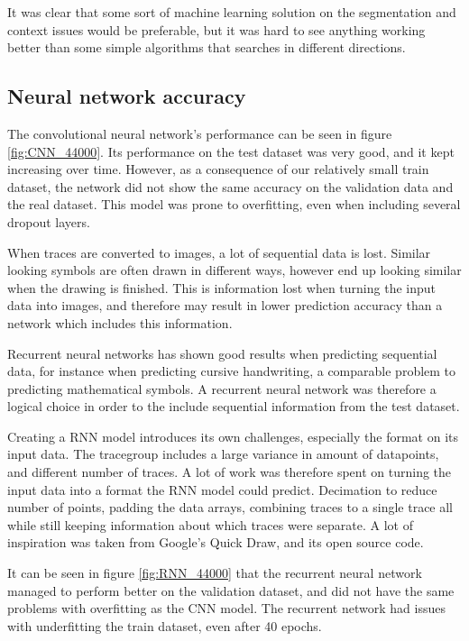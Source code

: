 It was clear that some sort of machine learning solution on the segmentation and context issues would be preferable, but it was hard to see anything working better than some simple algorithms that searches in different directions.

\subsection{Neural network accuracy}
The convolutional neural network's performance can be seen in figure \ref{fig:CNN_44000}. Its performance on the test dataset was very good, and it kept increasing over time. However, as a consequence of our relatively small train dataset, the network did not show the same accuracy on the validation data and the real dataset. This model was prone to overfitting, even when including several dropout layers. 

When traces are converted to images, a lot of sequential data is lost. Similar looking symbols are often drawn in different ways, however end up looking similar when the drawing is finished. This is information lost when turning the input data into images, and therefore may result in lower prediction accuracy than a network which includes this information.

Recurrent neural networks has shown good results when predicting sequential data, for instance when predicting cursive handwriting, a comparable problem to predicting mathematical symbols. A recurrent neural network was therefore a logical choice in order to the include sequential information from the test dataset. 

Creating a RNN model introduces its own challenges, especially the format on its input data. The tracegroup includes a large variance in amount of datapoints, and different number of traces. A lot of work was therefore spent on turning the input data into a format the RNN model could predict. Decimation to reduce number of points, padding the data arrays, combining traces to a single trace all while still keeping information about which traces were separate. A lot of inspiration was taken from Google's Quick Draw, and its open source code. \cite{_recurrent_2017} 

It can be seen in figure \ref{fig:RNN_44000} that the recurrent neural network managed to perform better on the validation dataset, and did not have the same problems with overfitting as the CNN model. The recurrent network had issues with underfitting the train dataset, even after 40 epochs. 

